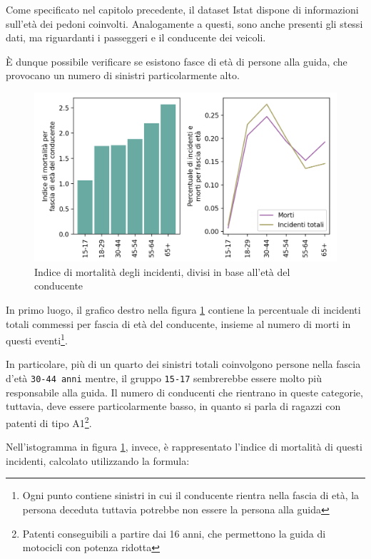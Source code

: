 \documentclass[a4paper]{report}
\newcommand{\columnstyle}[1]{\texttt{#1}}
\begin{document}
Come specificato nel capitolo precedente, il dataset Istat dispone di 
informazioni sull'età dei pedoni coinvolti. Analogamente a questi, 
sono anche presenti gli stessi dati, ma riguardanti i passeggeri e il conducente dei 
veicoli. 

\`E dunque possibile verificare se esistono fasce di età di persone alla guida, 
che provocano un numero di sinistri particolarmente alto. 

\begin{figure}
    \includegraphics[width=\linewidth]{../src/incidenti/incidenti_senza_coords/mortalita/indice_mortalita_eta.png}
    \caption{Indice di mortalità degli incidenti, divisi in base all'età del conducente}
    \label{fig:indice-mortalita-eta}
\end{figure}

In primo luogo, il grafico destro nella figura \ref{fig:indice-mortalita-eta} contiene 
la percentuale di incidenti totali commessi per fascia di età del conducente, insieme 
al numero di morti in questi eventi\footnote{Ogni punto contiene sinistri in 
cui il conducente rientra nella fascia di età, la persona deceduta tuttavia potrebbe non 
essere la persona alla guida}. 

In particolare, più di un quarto dei sinistri totali coinvolgono persone nella 
fascia d'età \columnstyle{30-44 anni} mentre, il gruppo \columnstyle{15-17} sembrerebbe 
essere molto più responsabile alla guida. Il numero di conducenti che rientrano 
in queste categorie, tuttavia, deve essere particolarmente basso, in quanto si 
parla di ragazzi con patenti di tipo A1\footnote{Patenti conseguibili a partire dai 16 anni, 
che permettono la guida di motocicli con potenza ridotta}. 

Nell'istogramma in figura \ref{fig:indice-mortalita-eta}, invece, 
è rappresentato l'indice di mortalità di questi incidenti, 
calcolato utilizzando la formula: 
\end{document}
